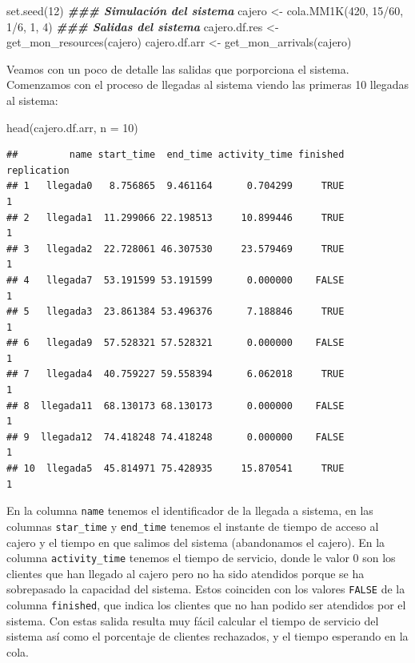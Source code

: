 \documentclass[
]{book}
\newenvironment{Shaded}{\begin{snugshade}}{\end{snugshade}}
\newcommand{\AttributeTok}[1]{\textcolor[rgb]{0.77,0.63,0.00}{#1}}
\newcommand{\DecValTok}[1]{\textcolor[rgb]{0.00,0.00,0.81}{#1}}
\newcommand{\DocumentationTok}[1]{\textcolor[rgb]{0.56,0.35,0.01}{\textbf{\textit{#1}}}}
\newcommand{\FunctionTok}[1]{\textcolor[rgb]{0.00,0.00,0.00}{#1}}
\newcommand{\NormalTok}[1]{#1}
\newcommand{\OtherTok}[1]{\textcolor[rgb]{0.56,0.35,0.01}{#1}}
\newcommand{\SpecialCharTok}[1]{\textcolor[rgb]{0.00,0.00,0.00}{#1}}
\theoremstyle{definition}
\theoremstyle{definition}
\theoremstyle{definition}
\theoremstyle{definition}
\theoremstyle{remark}
\begin{document}
\begin{Shaded}
\begin{Highlighting}[]
\FunctionTok{set.seed}\NormalTok{(}\DecValTok{12}\NormalTok{)}
\DocumentationTok{\#\#\# Simulación del sistema}
\NormalTok{cajero }\OtherTok{\textless{}{-}} \FunctionTok{cola.MM1K}\NormalTok{(}\DecValTok{420}\NormalTok{, }\DecValTok{15}\SpecialCharTok{/}\DecValTok{60}\NormalTok{, }\DecValTok{1}\SpecialCharTok{/}\DecValTok{6}\NormalTok{, }\DecValTok{1}\NormalTok{, }\DecValTok{4}\NormalTok{)}
\DocumentationTok{\#\#\# Salidas del sistema}
\NormalTok{cajero.df.res }\OtherTok{\textless{}{-}} \FunctionTok{get\_mon\_resources}\NormalTok{(cajero)}
\NormalTok{cajero.df.arr }\OtherTok{\textless{}{-}} \FunctionTok{get\_mon\_arrivals}\NormalTok{(cajero)}
\end{Highlighting}
\end{Shaded}

Veamos con un poco de detalle las salidas que porporciona el sistema. Comenzamos con el proceso de llegadas al sistema viendo las primeras 10 llegadas al sistema:

\begin{Shaded}
\begin{Highlighting}[]
\FunctionTok{head}\NormalTok{(cajero.df.arr, }\AttributeTok{n =} \DecValTok{10}\NormalTok{)}
\end{Highlighting}
\end{Shaded}

\begin{verbatim}
##         name start_time  end_time activity_time finished replication
## 1   llegada0   8.756865  9.461164      0.704299     TRUE           1
## 2   llegada1  11.299066 22.198513     10.899446     TRUE           1
## 3   llegada2  22.728061 46.307530     23.579469     TRUE           1
## 4   llegada7  53.191599 53.191599      0.000000    FALSE           1
## 5   llegada3  23.861384 53.496376      7.188846     TRUE           1
## 6   llegada9  57.528321 57.528321      0.000000    FALSE           1
## 7   llegada4  40.759227 59.558394      6.062018     TRUE           1
## 8  llegada11  68.130173 68.130173      0.000000    FALSE           1
## 9  llegada12  74.418248 74.418248      0.000000    FALSE           1
## 10  llegada5  45.814971 75.428935     15.870541     TRUE           1
\end{verbatim}

En la columna \texttt{name} tenemos el identificador de la llegada a sistema, en las columnas \texttt{star\_time} y \texttt{end\_time} tenemos el instante de tiempo de acceso al cajero y el tiempo en que salimos del sistema (abandonamos el cajero). En la columna \texttt{activity\_time} tenemos el tiempo de servicio, donde le valor 0 son los clientes que han llegado al cajero pero no ha sido atendidos porque se ha sobrepasado la capacidad del sistema. Estos coinciden con los valores \texttt{FALSE} de la columna \texttt{finished}, que indica los clientes que no han podido ser atendidos por el sistema. Con estas salida resulta muy fácil calcular el tiempo de servicio del sistema así como el porcentaje de clientes rechazados, y el tiempo esperando en la cola.
\end{document}
